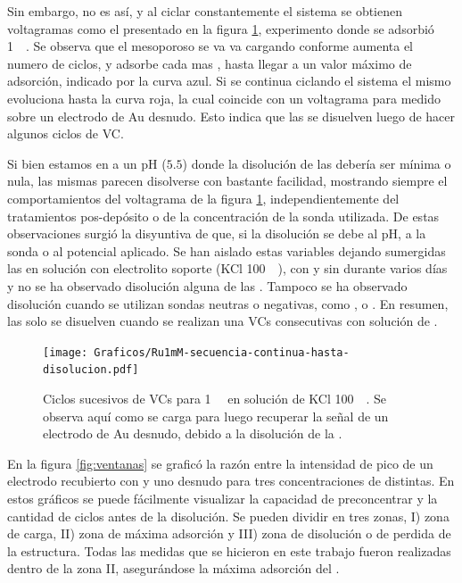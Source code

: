 		Sin embargo, no es así, y al ciclar constantemente el sistema se obtienen voltagramas como el presentado en la figura \ref{fig:diso_ru1mM}, experimento donde se adsorbió \ru\space \SI{1}{\milli\Molar}. Se observa que el mesoporoso se va va cargando conforme aumenta el numero de ciclos, y adsorbe cada mas \ru, hasta llegar a un valor máximo de adsorción, indicado por la curva azul. Si se continua ciclando el sistema el mismo evoluciona hasta la curva roja, la cual coincide con un voltagrama para \ru\space medido sobre un electrodo de Au desnudo. Esto indica que las \pdmF\space se disuelven luego de hacer algunos ciclos de VC.

		Si bien estamos en a un pH ($5.5$) donde la disolución de las \pdmF\space debería ser mínima o nula, las mismas parecen disolverse con bastante facilidad, mostrando siempre el comportamientos del voltagrama de la figura \ref{fig:diso_ru1mM}, independientemente del tratamientos pos-depósito o de la concentración de la sonda utilizada. De estas observaciones surgió la disyuntiva de que, si la disolución se debe al pH, a la sonda o al potencial aplicado. Se han aislado estas variables dejando sumergidas las \pdmF\space en solución con electrolito soporte (KCl \SI{100}{\milli\Molar}), con y sin \ru\space durante varios días y no se ha observado disolución alguna de las \pdm. Tampoco se ha observado disolución cuando se utilizan sondas neutras o negativas, como \fe, \hq\space o \fc. En resumen, las \pdmF\space solo se disuelven cuando se realizan una VCs consecutivas con solución de \ru\space.
			
			\begin{figure}[ht]
				\centering
		 	    \texttt{[image: Graficos/Ru1mM-secuencia-continua-hasta-disolucion.pdf]}
		        \caption[Disolución de una \pdmF\space en \ru.]{Ciclos sucesivos de VCs para \ru\space \SI{1}{\milli\Molar} en solución de KCl \SI{100}{\milli\Molar}. Se observa aquí como se carga para luego recuperar la señal de un electrodo de Au desnudo, debido a la disolución de la \pdmF.}
		        \label{fig:diso_ru1mM}
		      	\end{figure} 

		 En la figura \ref{fig:ventanas} se graficó la razón entre la intensidad de pico de un electrodo recubierto con \pdmF\space y uno desnudo para tres concentraciones de \ru\space distintas. En estos gráficos se puede fácilmente visualizar la capacidad de preconcentrar y la cantidad de ciclos antes de la disolución. Se pueden dividir en tres zonas, I) zona de carga, II) zona de máxima adsorción y III) zona de disolución o de perdida de la estructura. Todas las medidas que se hicieron en este trabajo fueron realizadas dentro de la zona II, asegurándose la máxima adsorción del \ru\space.

